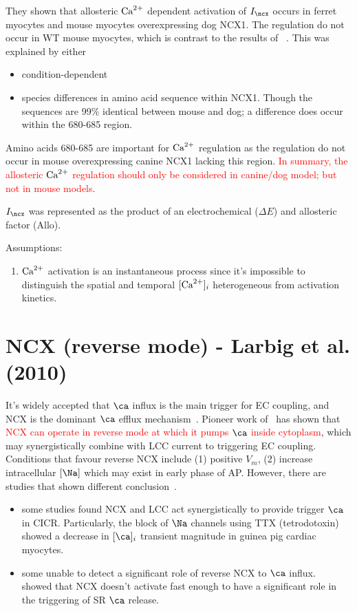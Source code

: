 They shown that allosteric ${\text{Ca}^{2+}}$ dependent activation of $I_\ncx$
occurs in ferret myocytes and mouse myocytes overexpressing dog
NCX1. The regulation do not occur in WT mouse myocytes, which is
contrast to the results of ~\citep{maxwell1999}. This was explained by
either
\begin{itemize}
\item condition-dependent
\item species differences in amino acid sequence within NCX1. Though
  the sequences are 99\% identical between mouse and dog; a difference
  does occur within the 680-685 region.
\end{itemize}
Amino acids 680-685 are important for ${\text{Ca}^{2+}}$ regulation as the
regulation do not occur in mouse overexpressing canine NCX1 lacking
this region.
\textcolor{red}{In summary, the allosteric ${\text{Ca}^{2+}}$ regulation should
  only be considered in canine/dog model; but not in mouse models}.

$I_\ncx$ was represented as the product of an electrochemical ($\Delta
E$) and allosteric factor (Allo).

Assumptions:
\begin{enumerate}
\item ${\text{Ca}^{2+}}$ activation is an instantaneous process since it's
  impossible to distinguish the spatial and temporal $[{\text{Ca}^{2+}}]_i$
  heterogeneous from activation kinetics. 
\end{enumerate}


\section{NCX (reverse mode) - Larbig et al. (2010)}
\label{sec:ncx-reverse-mode}

It's widely accepted that $\ca$ influx is the main trigger for EC
coupling, and NCX is the dominant $\ca$ efflux mechanism~\citep{}.
Pioneer work of~\citep{Leblanc1990} has shown that
\textcolor{red}{NCX can operate in reverse mode at which it pumps
  $\ca$ inside cytoplasm},
which may synergistically combine with LCC current to triggering EC
coupling. Conditions that favour reverse NCX include (1) positive
$V_m$, (2) increase intracellular $[\Na]$ which may exist in early
phase of AP. However, there are studies that shown different
conclusion~\citep{Bouchard1993, Sipido1997}.
\begin{itemize}
\item some studies found NCX and LCC act synergistically to provide
  trigger $\ca$ in CICR. Particularly, the block of $\Na$ channels
  using TTX (tetrodotoxin) showed a decrease in $[\ca]_i$ transient
  magnitude in guinea pig cardiac myocytes.
\item some unable to detect a significant role of reverse NCX to $\ca$
  influx. ~\citep{Sham1992} showed that NCX doesn't activate fast
  enough to have a significant role in the triggering of SR $\ca$
  release.
\end{itemize}

